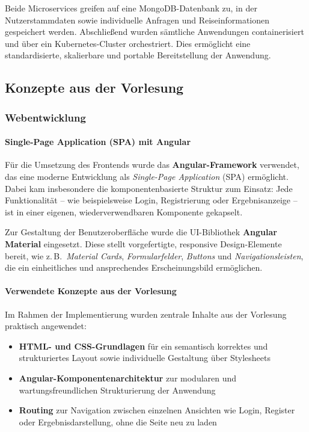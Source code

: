 Beide Microservices greifen auf eine MongoDB-Datenbank zu, in der Nutzerstammdaten sowie individuelle Anfragen und Reiseinformationen gespeichert werden.  
Abschließend wurden sämtliche Anwendungen containerisiert und über ein Kubernetes-Cluster orchestriert. Dies ermöglicht eine standardisierte, skalierbare und portable Bereitstellung der Anwendung.

\subsection{Konzepte aus der Vorlesung}

\subsubsection{Webentwicklung}

\paragraph{Single-Page Application (SPA) mit Angular}  
Für die Umsetzung des Frontends wurde das \textbf{Angular-Framework} verwendet, das eine moderne Entwicklung als \textit{Single-Page Application} (SPA) ermöglicht. Dabei kam insbesondere die komponentenbasierte Struktur zum Einsatz: Jede Funktionalität – wie beispielsweise Login, Registrierung oder Ergebnisanzeige – ist in einer eigenen, wiederverwendbaren Komponente gekapselt. 

Zur Gestaltung der Benutzeroberfläche wurde die UI-Bibliothek \textbf{Angular Material} eingesetzt. Diese stellt vorgefertigte, responsive Design-Elemente bereit, wie z.\,B.\ \textit{Material Cards}, \textit{Formularfelder}, \textit{Buttons} und \textit{Navigationsleisten}, die ein einheitliches und ansprechendes Erscheinungsbild ermöglichen.

\paragraph{Verwendete Konzepte aus der Vorlesung}  
Im Rahmen der Implementierung wurden zentrale Inhalte aus der Vorlesung praktisch angewendet:

\begin{itemize}
  \item \textbf{HTML- und CSS-Grundlagen} für ein semantisch korrektes und strukturiertes Layout sowie individuelle Gestaltung über Stylesheets
  \item \textbf{Angular-Komponentenarchitektur} zur modularen und wartungsfreundlichen Strukturierung der Anwendung
  \item \textbf{Routing} zur Navigation zwischen einzelnen Ansichten wie Login, Register oder Ergebnisdarstellung, ohne die Seite neu zu laden
\end{itemize}


